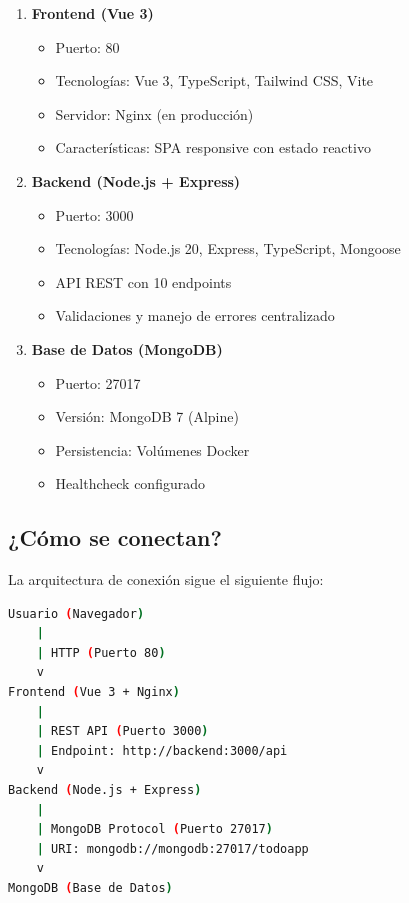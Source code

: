 \documentclass[12pt,a4paper]{article}
\begin{document}
\begin{enumerate}
    \item \textbf{Frontend (Vue 3)}
    \begin{itemize}
        \item Puerto: 80
        \item Tecnologías: Vue 3, TypeScript, Tailwind CSS, Vite
        \item Servidor: Nginx (en producción)
        \item Características: SPA responsive con estado reactivo
    \end{itemize}
    
    \item \textbf{Backend (Node.js + Express)}
    \begin{itemize}
        \item Puerto: 3000
        \item Tecnologías: Node.js 20, Express, TypeScript, Mongoose
        \item API REST con 10 endpoints
        \item Validaciones y manejo de errores centralizado
    \end{itemize}
    
    \item \textbf{Base de Datos (MongoDB)}
    \begin{itemize}
        \item Puerto: 27017
        \item Versión: MongoDB 7 (Alpine)
        \item Persistencia: Volúmenes Docker
        \item Healthcheck configurado
    \end{itemize}
\end{enumerate}

\subsection{¿Cómo se conectan?}

La arquitectura de conexión sigue el siguiente flujo:

\begin{lstlisting}[language=bash, caption=Flujo de comunicación entre servicios]
Usuario (Navegador)
    |
    | HTTP (Puerto 80)
    v
Frontend (Vue 3 + Nginx)
    |
    | REST API (Puerto 3000)
    | Endpoint: http://backend:3000/api
    v
Backend (Node.js + Express)
    |
    | MongoDB Protocol (Puerto 27017)
    | URI: mongodb://mongodb:27017/todoapp
    v
MongoDB (Base de Datos)
\end{lstlisting}
\end{document}
